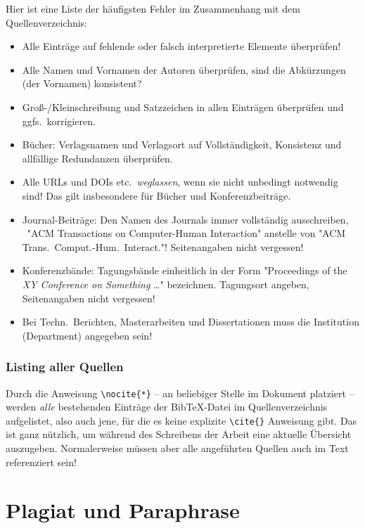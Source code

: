 Hier ist eine Liste der häufigsten Fehler im Zusammenhang mit dem Quellenverzeichnis:
%
\begin{itemize}
\item
Alle Einträge auf fehlende oder falsch interpretierte Elemente überprüfen!
\item
Alle Namen und Vornamen der Autoren überprüfen, sind die Abkürzungen (der Vornamen) konsistent?
\item
Groß-/Kleinschreibung und Satzzeichen in allen  Einträgen überprüfen und ggfs.\ korrigieren.
\item
Bücher: Verlagsnamen und Verlagsort auf Vollständigkeit, Konsistenz und allfällige
Redundanzen überprüfen.
\item
Alle URLs und DOIs etc.\ \emph{weglassen}, wenn sie nicht unbedingt notwendig sind! Das gilt insbesondere
für Bücher und Konferenzbeiträge.
\item
Journal-Beiträge: Den Namen des Journals immer vollständig ausschreiben, \zB\
"ACM Transactions on Computer-Human Interaction" anstelle von 
"ACM Trans.\ Comput.-Hum.\ Interact."! Seitenangaben nicht vergessen!
\item
Konferenzbände: 
Tagungsbände einheitlich in der Form "Proceedings of the \emph{XY Conference on Something} \ldots"
bezeichnen. Tagungsort angeben, Seitenangaben nicht vergessen!
\item
Bei Techn.\ Berichten, Masterarbeiten und Dissertationen muss die Institution (Department)
angegeben sein!
\end{itemize}
 

\subsubsection{Listing aller Quellen}

Durch die Anweisung \verb!\nocite{*}! -- an beliebiger Stelle im Dokument platziert -- werden \emph{alle} bestehenden Einträge der BibTeX-Datei im Quellenverzeichnis aufgelistet, also auch jene, für die es keine explizite \verb!\cite{}! Anweisung gibt. Das ist ganz nützlich, um während des Schreibens der Arbeit eine aktuelle Übersicht auszugeben. Normalerweise müssen aber alle angeführten Quellen auch im Text referenziert sein!



\section{Plagiat und Paraphrase}
\label{sec:Plagiarismus}

